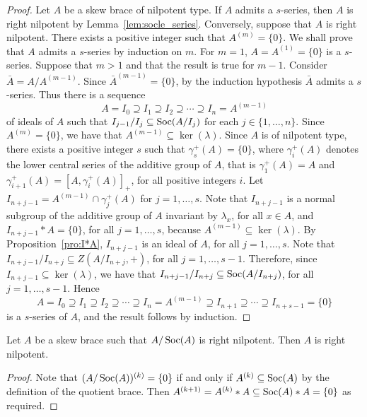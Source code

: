 \begin{proof}
    Let $A$ be a skew brace of nilpotent type. If $A$ admits a $s$-series, then $A$ is right nilpotent by
    Lemma~\ref{lem:socle_series}.
    Conversely, suppose that $A$ is right nilpotent.
    There exists a positive integer such that $A^{(m)}=\{0\}$.
    We shall prove that $A$ admits a $s$-series by induction on $m$. For $m=1$, $A=A^{(1)}=\{0\}$ is a $s$-series. Suppose
    that $m>1$ and that the result is true for $m-1$. Consider
    $\bar A=A/A^{(m-1)}$. Since $\bar A^{(m-1)}=\{0\}$, by the induction
    hypothesis $\bar A$ admits a $s$-series. Thus there is a
    sequence
    \[
        A=I_0\supseteq I_1\supseteq I_2\supseteq\cdots\supseteq I_n=A^{(m-1)}
    \]
    of ideals of $A$ such that $I_{j-1}/I_j\subseteq \operatorname{Soc}(A/I_j)$ for each
    $j\in\{1,\dots,n\}$. Since $A^{(m)}=\{0\}$, we have that $A^{(m-1)}\subseteq
    \ker(\lambda)$. Since $A$ is of nilpotent type, there exists a
    positive integer $s$ such that $\gamma^+_s(A)=\{0\}$, where
    $\gamma^+_i(A)$ denotes the lower central series of the additive
    group of $A$, that is $\gamma^+_1(A)=A$ and $\gamma^+_{i+1}(A)=[A,\gamma^+_i(A)]_+$, for all positive integers $i$.
    Let $I_{n+j-1}=A^{(m-1)}\cap \gamma^+_{j}(A)$ for $j=1,\dots ,s$.
    Note that $I_{n+j-1}$ is a normal subgroup of the additive group
    of $A$ invariant by $\lambda_x$, for all $x\in A$, and
    $I_{n+j-1}* A=\{0\}$, for all $j=1,\dots , s$, because $A^{(m-1)}\subseteq
    \ker(\lambda)$. By Proposition~\ref{pro:I*A}, $I_{n+j-1}$ is an ideal
    of $A$, for all $j=1,\dots , s$.
    Note that $I_{n+j-1}/I_{n+j}\subseteq Z(A/I_{n+j},+)$, for all $j=1,\dots ,s-1$. Therefore, since
    $I_{n+j-1}\subseteq\ker(\lambda)$, we have that $I_{n+j-1}/I_{n+j}\subseteq \operatorname{Soc}(A/I_{n+j})$, for all $j=1,\dots ,s-1$.
    Hence
    \[
        A=I_0\supseteq I_1\supseteq I_2\supseteq\cdots\supseteq
        I_n=A^{(m-1)}\supseteq I_{n+1}\supseteq\cdots\supseteq
        I_{n+s-1}=\{0\}
    \]
    is a $s$-series of $A$, and the result follows by induction.
\end{proof}

\begin{proposition}
    \label{pro:A/Soc}
    Let $A$ be a skew brace such that $A/\operatorname{Soc}(A)$ is right nilpotent. Then $A$
    is right nilpotent.
\end{proposition}

\begin{proof}
    Note that $(A/\operatorname{Soc}(A))^{(k)}=\{0\}$ if and only if $A^{(k)}\subseteq\operatorname{Soc}(A)$ by
    the definition of the quotient brace. Then $A^{(k+1)}=A^{(k)}*A\subseteq\operatorname{Soc}
    (A)*A=\{0\}$ as required.
\end{proof}

